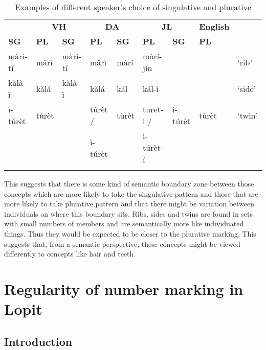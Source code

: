 \documentclass[output=paper]{langsci/langscibook}
\begin{document}
\begin{table}
\begin{tabularx}{\textwidth}{lllllllll}
\lsptoprule

\multicolumn{2}{c}{ \textbf{AL}} & \multicolumn{2}{c}{ \textbf{VH}} & \multicolumn{2}{c}{ \textbf{DA}} & \multicolumn{2}{c}{ \textbf{JL}} & \textbf{English}\\ \cmidrule(lr){1-2}\cmidrule(lr){3-4}\cmidrule(lr){5-6}\cmidrule(lr){7-8}
\textbf{SG} & \textbf{PL} & \textbf{SG} & \textbf{PL} & \textbf{SG} & \textbf{PL} & \textbf{SG} & 
 \textbf{PL} & \\ \midrule
 m\`{a}r\'{i}-t\'{i} &  m\^{a}r\`{i} &  m\`{a}r\'{i}-t\'{i} &  m\^{a}r\`{i} &  m\`{a}r\'{i} &  m\`{a}r\'{i}-j\'{i}n &  &  & ‘rib’\\
 k\`{a}l\`{a}-\`{i} &  k\`{a}l\'{a} &  k\`{a}l\`{a}-\`{i} &  k\`{a}l\'{a} &  k\'{a}l &  k\'{a}l-\`{i} &  &  & ‘side’\\
 \`{i}-t\'{u}r\`{e}t &  t\`{u}r\`{e}t &  &  t\`{u}r\`{e}t / & {t\`{u}r\`{e}t } & {turet-i /}

&  \`{i}-t\'{u}r\`{e}t &  t\`{u}r\`{e}t & ‘twin’\\
&&&  \`{i}-t\'{u}r\`{e}t &&  \`{i}-t\'{u}r\`{e}t-\'{i} & & \\
\lspbottomrule
\end{tabularx}
\caption{Examples of different speaker’s choice of singulative and plurative}
\label{tab:moodie:8}
\end{table}

This suggests that there is some kind of semantic boundary zone between those concepts which are more likely to take the singulative pattern and those that are more likely to take plurative pattern and that there might be variation between individuals on where this boundary sits. Ribs, sides and twins are found in sets with small numbers of members and are semantically more like individuated things. Thus they would be expected to be closer to the plurative marking. This suggests that, from a semantic perspective, these concepts might be viewed differently to concepts like hair and teeth.

\section{Regularity of number marking in Lopit}\label{sec:moodie:4}


\subsection{Introduction} \label{sec:moodie:4.1}
\end{document}
